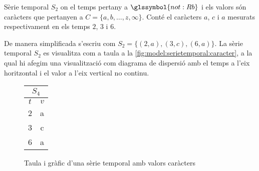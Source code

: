 \begin{example}
  Sèrie temporal $S_2$ on el temps pertany a $\glssymbol{not:Rb}$ i els valors
  són caràcters que pertanyen a $C=\{a,b,\dotsc,z,\infty\}$. Conté el
  caràcters $a$, $c$ i $a$ mesurats respectivament en els temps $2$,
  $3$ i $6$.

De manera simplificada s'escriu com $S_2 = \{ (2,a), (3,c), (6,a) \}$.
La sèrie temporal $S_2$ es visualitza com a taula a la
\autoref{fig:model:serietemporal:caracter}, a la qual hi afegim una
visualització com diagrama de dispersió amb el temps a l'eix
horitzontal i el valor a l'eix vertical no continu.

\begin{figure}[tp]
  \centering
  \begin{tabular}[c]{|c|c|}
    \multicolumn{2}{c}{$S_4$} \\ \hline
    $t$  & $v$ \\ \hline
    2  & a \\
    3  & c \\
    6  & a \\ \hline
  \end{tabular} \qquad
  \caption{Taula i gràfic d'una sèrie temporal amb valors caràcters}
  \label{fig:model:serietemporal:caracter}
\end{figure}

\end{example}



